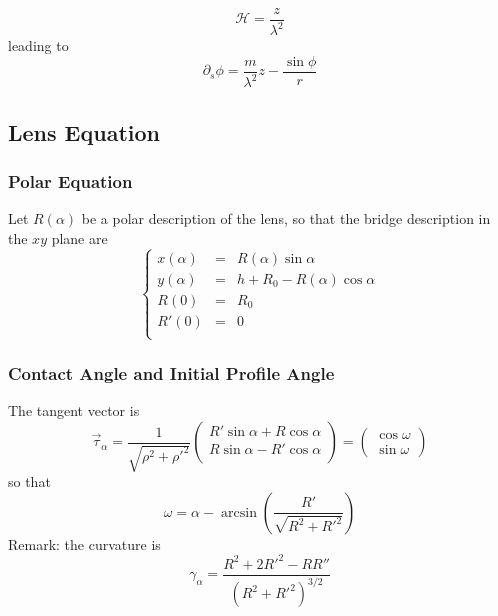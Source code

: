 \documentclass[aps,onecolumn]{revtex4}
\begin{document}
\begin{equation}
	\mathcal{H} = \dfrac{z}{\lambda^2}
\end{equation}
leading to
\begin{equation}
	\partial_s \phi = \dfrac{m}{\lambda^2} z  - \dfrac{\sin\phi}{r}
\end{equation}

\subsection{Lens Equation}

\subsubsection{Polar Equation}
Let $R(\alpha)$ be a polar description of the lens, so that the bridge description in the $xy$ plane are
\begin{equation}
	\left\lbrace
	\begin{array}{rcl}
	x(\alpha) & = & R(\alpha)\sin\alpha\\
	y(\alpha) & = & h + R_0 - R(\alpha)\cos\alpha\\
	R(0)   & = & R_0\\
	R'(0)  & = & 0\\
	\end{array}
	\right.
\end{equation}

\subsubsection{Contact Angle and Initial Profile Angle}
The   tangent vector is
\begin{equation}
	\vec{\tau}_\alpha = 
	\dfrac{1}{\sqrt{\rho^2+\rho'^2}}
	\begin{pmatrix}
		R'\sin\alpha+R\cos\alpha\\
		R\sin\alpha - R'\cos\alpha\\
	\end{pmatrix}
 = 
 	\begin{pmatrix}
	\cos\omega\\
	\sin\omega
	\end{pmatrix}
\end{equation}
so that
\begin{equation}
	\label{eq:omega}
	\omega = \alpha - \arcsin\left(\dfrac{R'}{\sqrt{R^2+R'^2}}\right)
\end{equation}
Remark: the curvature is
\begin{equation}
	\gamma_\alpha = \dfrac{R^2 + 2R'^2 - RR''}{\left(R^2+R'^2\right)^{3/2}}
\end{equation}
\end{document}
